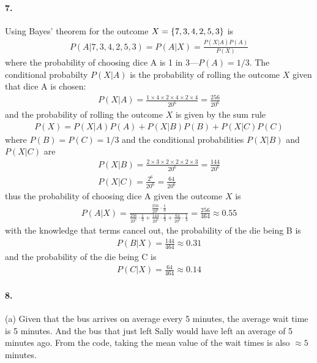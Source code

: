 \documentclass[../main.tex]{subfiles}
\begin{document}
\paragraph{7.}
Using Bayes' theorem for the outcome $X = \qt{7,3,4,2,5,3}$ is 
\begin{align*}
    P(A | 7,3,4,2,5,3) = P(A | X)  = \frac{P( X | A) P(A)}{P(X)}
\end{align*}
where the probability of choosing dice A is 1 in 3---$P(A) = 1/3$. The conditional probabilty 
$P(X | A)$ is the probability of rolling the outcome $X$ given that dice A is chosen:
\begin{align*}
    P(X | A) = \frac{1 \times 4 \times 2 \times 4 \times 2 \times 4}{20^6} = \frac{256}{20^6}
\end{align*}
and the probability of rolling the outcome $X$ is given by the sum rule
\begin{align*}
    P(X) = P(X | A) P(A) + P(X | B) P(B) + P(X | C) P(C)
\end{align*}
where $P(B) = P(C) = 1/3$ and the conditional probabilities $P(X | B)$ and $P(X | C)$ are
\begin{align*}
    P(X | B) = \frac{2 \times 3 \times 2 \times 2 \times 2 \times 3}{20^6} = \frac{144}{20^6} \\
    P(X | C) = \frac{2^6}{20^6} = \frac{64}{20^6}
\end{align*}
thus the probability of choosing dice A given the outcome $X$ is
\begin{align*}
    P(A | X) = \frac{\frac{256}{20^6} \cdot \frac{1}{3}}{\frac{256}{20^6} \cdot \frac{1}{3} +
    \frac{144}{20^6} \cdot \frac{1}{3} + \frac{64}{20^6} \cdot \frac{1}{3}} = \frac{256}{464}
    \approx \boxed{0.55}
\end{align*}
with the knowledge that terms cancel out, the probability of the die being B is
\begin{align*}
    P(B | X) = \frac{144}{464} \approx \boxed{0.31}
\end{align*}
and the probability of the die being C is
\begin{align*}
    P(C | X) = \frac{64}{464} \approx \boxed{0.14}
\end{align*}

\paragraph{8.} (a) Given that the bus arrives on average every 5 minutes, the average wait time is
5 minutes. And the bus that just left Sally would have left an average of 5 minutes ago. From the
code, taking the mean value of the wait times is also $\approx 5$ minutes.
\end{document}
